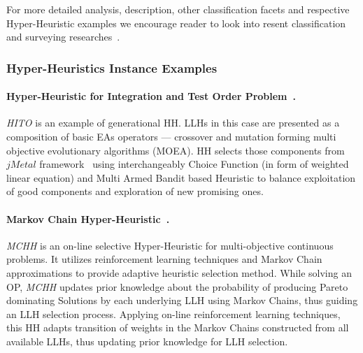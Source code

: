
	


For more detailed analysis, description, other classification facets and respective Hyper-Heuristic examples we encourage reader to look into resent classification and surveying researches~\cite{burke2003hyper,ryser2014review,drake2019recent,burke2019classification}.

\subsubsection{Hyper-Heuristics Instance Examples}\label{bg: hh examples}
\paragraph{Hyper-Heuristic for Integration and Test Order Problem~\cite{guizzo2015hyper}.} \textit{HITO} is an example of generational HH. LLHs in this case are presented as a composition of basic EAs operators — crossover and mutation forming multi objective evolutionary algorithms (MOEA). HH selects those components from $jMetal$ framework~\cite{durillo2011jmetal} using interchangeably Choice Function (in form of weighted linear equation) and Multi Armed Bandit based Heuristic to balance exploitation of good components and exploration of new promising ones.


\paragraph{Markov Chain Hyper-Heuristic~\cite{mcclymont2011markov}.} \textit{MCHH} is an on-line selective Hyper-Heuristic for multi-objective continuous problems. It utilizes reinforcement learning techniques and Markov Chain approximations to provide adaptive heuristic selection method. While solving an OP, \textit{MCHH} updates prior knowledge about the probability of producing Pareto dominating Solutions by each underlying LLH using Markov Chains, thus guiding an LLH selection process. Applying on-line reinforcement learning techniques, this HH adapts transition of weights in the Markov Chains constructed from all available LLHs, thus updating prior knowledge for LLH selection.


